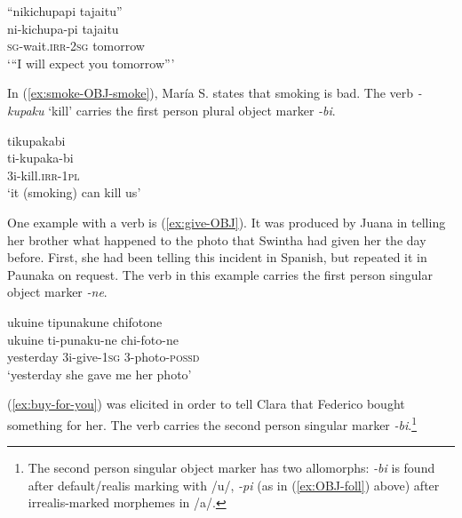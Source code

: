 \ea\label{ex:OBJ-foll}
\begingl 
\glpreamble “nikichupapi tajaitu”\\
\gla ni-kichupa-pi tajaitu\\ 
\textsc{sg}-wait.\textsc{irr}-2\textsc{sg} tomorrow\\ 
\glft ‘“I will expect you tomorrow”’
\trailingcitation{[jxx-p120430l-1.127]}
\xe

In (\ref{ex:smoke-OBJ-smoke}), María S. states that smoking is bad. The verb \textit{-kupaku} ‘kill’ carries the first person plural object marker \textit{-bi}.

\ea\label{ex:smoke-OBJ-smoke}
\begingl
\glpreamble tikupakabi\\
\gla ti-kupaka-bi\\
\glb 3i-kill.\textsc{irr}-1\textsc{pl}\\
\glft ‘it (smoking) can kill us’
\endgl
\trailingcitation{[rxx-e120511l.385]}
\xe

%

One example with a  verb is (\ref{ex:give-OBJ}). It was produced by Juana in telling her brother what happened to the photo that Swintha had given her the day before. First, she had been telling this incident in Spanish, but repeated it in Paunaka on request. The verb in this example carries the first person singular object marker \textit{-ne}.

\ea\label{ex:give-OBJ}
\begingl 
\glpreamble ukuine tipunakune chifotone\\
\gla ukuine ti-punaku-ne chi-foto-ne\\ 
\glb yesterday 3i-give-1\textsc{sg} 3-photo-\textsc{possd}\\ 
\glft ‘yesterday she gave me her photo’
\trailingcitation{[jmx-e090727s.041]}
\xe

(\ref{ex:buy-for-you}) was elicited in order to tell Clara that Federico bought something for her. The verb carries the second person singular marker \textit{-bi}.\footnote{The second person singular object marker has two allomorphs: \textit{-bi} is found after default/realis marking with /u/, \textit{-pi} (as in (\ref{ex:OBJ-foll}) above) after irrealis-marked morphemes in /a/.}


